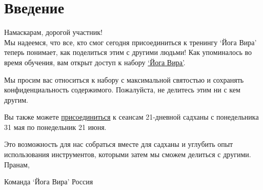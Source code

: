 \section{Введение}
Намаскарам, дорогой участник!
\\

Мы надеемся, что все, кто смог сегодня присоединиться к тренингу ‘Йога Вира’ теперь понимает, как поделиться этим с другими людьми!
Как упоминалось во время обучения, вам открыт доступ к набору \href{https://ishaeu.org/Набор-Йога-Вира}{‘Йога Вира’}.

Мы просим вас относиться к набору с максимальной святостью и сохранять конфиденциальность содержимого. Пожалуйста, не делитесь этим ни с кем другим.
 
Вы также можете \href{https://www.google.com/url?q=https%3A%2F%2Fishaeu.org%2F21day-sadhana-RU&sa=D&sntz=1&usg=AFQjCNEm-YTsVNtaS-i5F1qudgIsQpoTQQ}{присоединиться} к сеансам 21-дневной садханы с понедельника 31 мая по понедельник 21 июня.

Это возможность для нас собраться вместе для садханы и углубить опыт использования инструментов, которыми затем мы сможем делиться с другими.
\\

Пранам,

Команда ‘Йога Вира’ Россия
